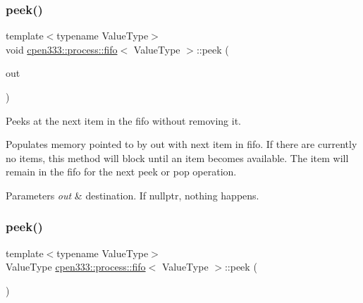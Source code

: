 \subsubsection{\texorpdfstring{peek()}{peek()}\hspace{0.1cm}{\footnotesize\ttfamily [1/2]}}
{\footnotesize\ttfamily template$<$typename Value\+Type$>$ \\
void \hyperlink{classcpen333_1_1process_1_1fifo}{cpen333\+::process\+::fifo}$<$ Value\+Type $>$\+::peek (\begin{DoxyParamCaption}\item[{Value\+Type $\ast$}]{out }\end{DoxyParamCaption})\hspace{0.3cm}{\ttfamily [inline]}}



Peeks at the next item in the fifo without removing it. 

Populates memory pointed to by {\ttfamily out} with next item in fifo. If there are currently no items, this method will block until an item becomes available. The item will remain in the fifo for the next {\ttfamily peek} or {\ttfamily pop} operation.


\begin{DoxyParams}{Parameters}
{\em out} & destination. If {\ttfamily nullptr}, nothing happens. \\
\hline
\end{DoxyParams}
\mbox{\label{classcpen333_1_1process_1_1fifo_a785266ee082e1917198bd0d701b25e50}} 
\subsubsection{\texorpdfstring{peek()}{peek()}\hspace{0.1cm}{\footnotesize\ttfamily [2/2]}}
{\footnotesize\ttfamily template$<$typename Value\+Type$>$ \\
Value\+Type \hyperlink{classcpen333_1_1process_1_1fifo}{cpen333\+::process\+::fifo}$<$ Value\+Type $>$\+::peek (\begin{DoxyParamCaption}{ }\end{DoxyParamCaption})\hspace{0.3cm}{\ttfamily [inline]}}



